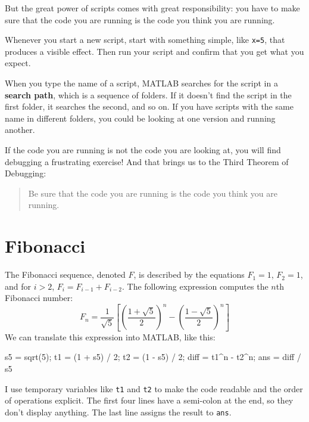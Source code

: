 \documentclass[main.tex]{subfiles}
\begin{document}
But the great power of scripts comes with great responsibility:
you have to make sure that the code you are running is the code you think you are running.

Whenever you start a new script, start with something simple,
like {\tt x=5}, that produces a visible effect.  Then run your script
and confirm that you get what you expect.

When you type the name of a script, MATLAB searches for the script in a {\bf search path}, which is a sequence of folders.  If it doesn't find the script in the first folder, it searches the second, and so on.
If you have scripts with the same name in different folders, you could be looking at one version and running another.



If the code you are running is not the code you are looking
at, you will find debugging a frustrating exercise!  And that brings
us to the Third Theorem of Debugging:

\begin{quote}
Be sure that the code you are running
is the code you think you are running.
\end{quote}


\section{Fibonacci}


The Fibonacci sequence, denoted $F$, is described by the equations
$F_1 = 1$, $F_2 = 1$, and for $i > 2$, $F_{i} = F_{i-1} + F_{i-2}$.
The following expression computes the $n$th Fibonacci number:
%
\begin{equation*}
F_n = \frac{1}{\sqrt{5}}
\left[
\left( \frac{1 + \sqrt{5}}{2} \right)^{n} -
\left( \frac{1 - \sqrt{5}}{2} \right)^{n}
\right]
\end{equation*}
%
We can translate this expression into MATLAB, like this:

\begin{code}
s5 = sqrt(5);
t1 = (1 + s5) / 2;
t2 = (1 - s5) / 2;
diff = t1^n - t2^n;
ans = diff / s5
\end{code}

I use temporary variables like {\tt t1} and {\tt t2} to make the code readable and the order of operations explicit.  The first four lines have a semi-colon at the end, so they don't display anything.  The last line assigns the result to {\tt ans}.
\end{document}
